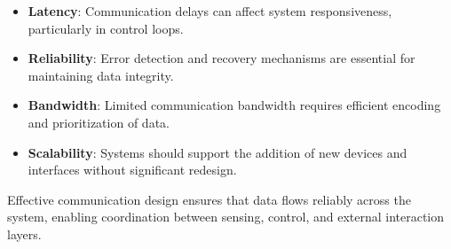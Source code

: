 \begin{itemize}
    \item \textbf{Latency}:  
    Communication delays can affect system responsiveness, particularly in control loops.

    \item \textbf{Reliability}:  
    Error detection and recovery mechanisms are essential for maintaining data integrity.

    \item \textbf{Bandwidth}:  
    Limited communication bandwidth requires efficient encoding and prioritization of data.

    \item \textbf{Scalability}:  
    Systems should support the addition of new devices and interfaces without significant redesign.
\end{itemize}

Effective communication design ensures that data flows reliably across the system, enabling coordination between sensing, control, and external interaction layers.